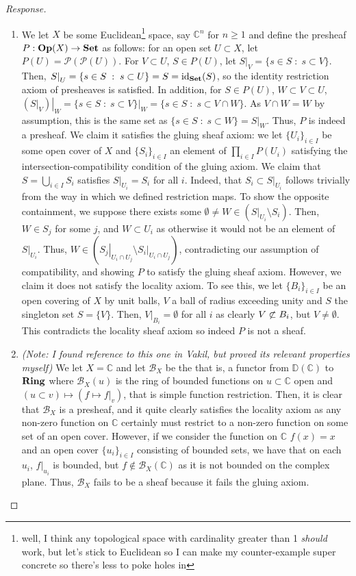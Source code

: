 \documentclass[english]{article}
\newcommand{\evat}[3]{\left. #1\right|_{#2}^{#3}}
\newcommand{\CC}{\mathbb{C}}
\newcommand{\DD}{\mathbb{D}}
\newcommand{\BB}{\mathcal{B}}
\newcommand{\Pcal}{\mathcal{P}}
\theoremstyle{remark}
\theoremstyle{definition}
\newcommand{\id}{\mathrm{id}}
\newcommand{\cat}[1]{{\mathrm{\bf{#1}}}}
\begin{document}
\begin{proof}[Response]
	\begin{enumerate}[label=\emph{(\roman*)}]
		\item We let $X$ be some Euclidean\footnote{well, I think any topological space with cardinality greater than 1 \emph{should} work, but let's stick to Euclidean so I can make my counter-example super concrete so there's less to poke holes in} space, say $\CC^n$ for $n\geq 1$ and define the  presheaf $P:\cat{Op}(X)\to \cat{Set}$ as follows: for an open set $U\subset X$, let $P(U)=\Pcal(\Pcal(U))$. For $V\subset U$, $S\in P(U)$, let $\evat{S}{V}{}=\{s\in S\;:\; s\subset V\}$. Then, $\evat{S}{U}{}=\{s\in S\;:\; s\subset U\}=S=\id_{\cat{Set}}(S)$, so the identity restriction axiom of presheaves is satisfied. In addition, for $S\in P(U)$, $W\subset V\subset U$, $\evat{\left(\evat{S}{V}{}\right)}{W}{}=\evat{\{s\in S\;:\;s\subset V\}}{W}{}=\{s\in S\;:\; s\subset V\cap W\}$. As $V\cap W=W$ by assumption, this is the same set as $\{s\in S\;:\; s\subset W\}=\evat{S}{W}{}$. Thus, $P$ is indeed a presheaf. We claim it satisfies the gluing sheaf axiom: we let $\{U_i\}_{i\in I}$ be some open cover of $X$ and $\{S_i\}_{i\in I}$ an element of $\prod_{i\in I}P(U_i)$ satisfying the intersection-compatibility condition of the gluing axiom. We claim that $S=\bigcup_{i\in I}S_i$ satisfies $\evat{S}{U_i}{}=S_i$ for all $i$. Indeed, that $S_i\subset \evat{S}{U_i}{}$ follows trivially from the way in which we defined restriction maps. To show the opposite containment, we suppose there exists some $\emptyset\neq W\in \left(\evat{S}{U_i}{}\setminus S_i\right)$. Then, $W\in S_j$ for some $j$, and $W\subset U_i$ as otherwise it would not be an element of $\evat{S}{U_i}{}$. Thus, $W\in \left(\evat{S_j}{U_i\cap U_j}{}\setminus \evat{S_i}{U_i\cap U_j}{}\right)$, contradicting our assumption of compatibility, and showing $P$ to satisfy the gluing sheaf axiom. However, we claim it does not satisfy the locality axiom. To see this, we let $\{B_i\}_{i\in I}$ be an open covering of $X$ by unit balls, $V$ a ball of radius exceeding unity and $S$ the singleton set $S=\{V\}$. Then, $\evat{V}{B_i}{}=\emptyset$ for all $i$ as clearly $V\centernot\subset B_i$, but $V\neq \emptyset$. This contradicts the locality sheaf axiom so indeed $P$ is not a sheaf.
		\item\emph{ (Note: I found reference to this one in Vakil, but proved its relevant properties myself)} We let $X=\CC$ and let $\BB_X$ be the  that is, a functor from $\DD(\CC)$ to $\cat{Ring}$ where $\BB_X(u)$ is the ring of bounded functions on $u\subset \CC$ open and $(u\subset v)\mapsto (f\mapsto \evat{f}{v}{})$, that is simple function restriction. Then, it is clear that $\BB_X$ is a presheaf, and it quite clearly satisfies the locality axiom as any non-zero function on $\CC$ certainly must restrict to a non-zero function on some set of an open cover. However, if we consider the function on $\CC$ $f(x)=x$ and an open cover $\{u_i\}_{i\in I}$ consisting of bounded sets, we have that on each $u_i$, $\evat{f}{u_i}{}$ is bounded, but $f\not \in \BB_X(\CC)$ as it is not bounded on the complex plane. Thus, $\BB_X$ fails to be a sheaf because it fails the gluing axiom.

\end{enumerate}
\end{proof}
\end{document}
